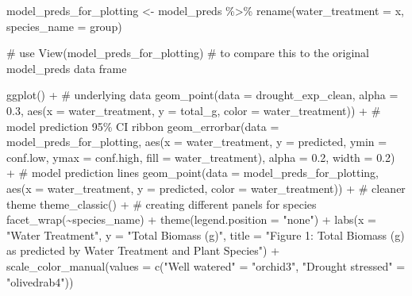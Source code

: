 \documentclass[
  letterpaper,
  DIV=11,
  numbers=noendperiod]{scrartcl}
\newenvironment{Shaded}{\begin{snugshade}}{\end{snugshade}}
\newcommand{\AttributeTok}[1]{\textcolor[rgb]{0.40,0.45,0.13}{#1}}
\newcommand{\CommentTok}[1]{\textcolor[rgb]{0.37,0.37,0.37}{#1}}
\newcommand{\FloatTok}[1]{\textcolor[rgb]{0.68,0.00,0.00}{#1}}
\newcommand{\FunctionTok}[1]{\textcolor[rgb]{0.28,0.35,0.67}{#1}}
\newcommand{\NormalTok}[1]{\textcolor[rgb]{0.00,0.23,0.31}{#1}}
\newcommand{\OtherTok}[1]{\textcolor[rgb]{0.00,0.23,0.31}{#1}}
\newcommand{\SpecialCharTok}[1]{\textcolor[rgb]{0.37,0.37,0.37}{#1}}
\newcommand{\StringTok}[1]{\textcolor[rgb]{0.13,0.47,0.30}{#1}}
\begin{document}
\begin{Shaded}
\begin{Highlighting}[]
\NormalTok{model\_preds\_for\_plotting }\OtherTok{\textless{}{-}}\NormalTok{ model\_preds }\SpecialCharTok{\%\textgreater{}\%} 
  \FunctionTok{rename}\NormalTok{(}\AttributeTok{water\_treatment =}\NormalTok{ x,}
         \AttributeTok{species\_name =}\NormalTok{ group)}

\CommentTok{\# use View(model\_preds\_for\_plotting) }
\CommentTok{\# to compare this to the original model\_preds data frame}

\FunctionTok{ggplot}\NormalTok{() }\SpecialCharTok{+}
  \CommentTok{\# underlying data}
  \FunctionTok{geom\_point}\NormalTok{(}\AttributeTok{data =}\NormalTok{ drought\_exp\_clean,}
             \AttributeTok{alpha =} \FloatTok{0.3}\NormalTok{,}
             \FunctionTok{aes}\NormalTok{(}\AttributeTok{x =}\NormalTok{ water\_treatment,}
                 \AttributeTok{y =}\NormalTok{ total\_g,}
                 \AttributeTok{color =}\NormalTok{ water\_treatment)) }\SpecialCharTok{+}
  \CommentTok{\# model prediction 95\% CI ribbon}
\FunctionTok{geom\_errorbar}\NormalTok{(}\AttributeTok{data =}\NormalTok{ model\_preds\_for\_plotting,}
             \FunctionTok{aes}\NormalTok{(}\AttributeTok{x =}\NormalTok{ water\_treatment, }
                  \AttributeTok{y =}\NormalTok{ predicted,}
                  \AttributeTok{ymin =}\NormalTok{ conf.low,}
                  \AttributeTok{ymax =}\NormalTok{ conf.high,}
                  \AttributeTok{fill =}\NormalTok{ water\_treatment),}
              \AttributeTok{alpha =} \FloatTok{0.2}\NormalTok{, }\AttributeTok{width =} \FloatTok{0.2}\NormalTok{) }\SpecialCharTok{+}
  \CommentTok{\# model prediction lines}
  \FunctionTok{geom\_point}\NormalTok{(}\AttributeTok{data =}\NormalTok{ model\_preds\_for\_plotting,}
            \FunctionTok{aes}\NormalTok{(}\AttributeTok{x =}\NormalTok{ water\_treatment, }
                \AttributeTok{y =}\NormalTok{ predicted,}
                \AttributeTok{color =}\NormalTok{ water\_treatment)) }\SpecialCharTok{+}
  \CommentTok{\# cleaner theme}
  \FunctionTok{theme\_classic}\NormalTok{() }\SpecialCharTok{+}
  \CommentTok{\# creating different panels for species}
  \FunctionTok{facet\_wrap}\NormalTok{(}\SpecialCharTok{\textasciitilde{}}\NormalTok{species\_name) }\SpecialCharTok{+} 
  \FunctionTok{theme}\NormalTok{(}\AttributeTok{legend.position =} \StringTok{"none"}\NormalTok{) }\SpecialCharTok{+} 
  \FunctionTok{labs}\NormalTok{(}\AttributeTok{x =} \StringTok{"Water Treatment"}\NormalTok{, }
       \AttributeTok{y =} \StringTok{"Total Biomass (g)"}\NormalTok{, }
       \AttributeTok{title =} \StringTok{"Figure 1: Total Biomass (g) as predicted by Water Treatment and Plant Species"}\NormalTok{) }\SpecialCharTok{+} 
  \FunctionTok{scale\_color\_manual}\NormalTok{(}\AttributeTok{values =} \FunctionTok{c}\NormalTok{(}\StringTok{"Well watered"} \OtherTok{=} \StringTok{"orchid3"}\NormalTok{, }
                                \StringTok{"Drought stressed"} \OtherTok{=} \StringTok{"olivedrab4"}\NormalTok{))}
\end{Highlighting}
\end{Shaded}
\end{document}
